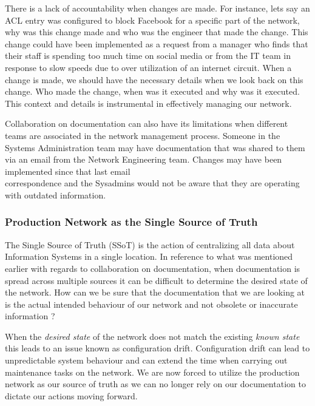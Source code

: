 \documentclass[12pt, letterpaper]{article}
\begin{document}
There is a lack of accountability when changes are made. For instance, lets say an ACL entry was configured to block Facebook for a specific part of the network, why was this change made and who was the engineer that made the change. This change could have been implemented as a request from a manager who finds that their staff is spending too much time on social media or from the IT team in response to slow speeds due to over utilization of an internet circuit.
When a change is made, we should have the necessary details when we look back on this change. Who made the change, when was it executed and why was it executed. This context and details is instrumental in effectively managing our network.

\smallskip

Collaboration on documentation can also have its limitations when different teams are associated in the network management process. Someone in the Systems Administration team may have documentation that was shared to them via an email from the Network Engineering team. Changes may have been implemented since that last email \\ correspondence and the Sysadmins would not be aware that they are operating with outdated information.  


	\subsubsection{Production Network as the Single Source of Truth}
The Single Source of Truth (SSoT) is the action of centralizing all data about Information Systems in a single location. In reference to what was mentioned earlier with regards to collaboration on documentation, when documentation is spread across multiple sources it can be difficult to determine the desired state of the network. How can we be sure that the documentation that we are looking at is the actual intended behaviour of our network and not obsolete or inaccurate information ?

\smallskip

When the \textit{desired state} of the network does not match the existing \textit{known state} this leads to an issue known as configuration drift. Configuration drift can lead to unpredictable system behaviour and can extend the time when carrying out maintenance tasks on the network. We are now forced to utilize the production network as our source of truth as we can no longer rely on our documentation to dictate our actions moving forward. 
\end{document}
